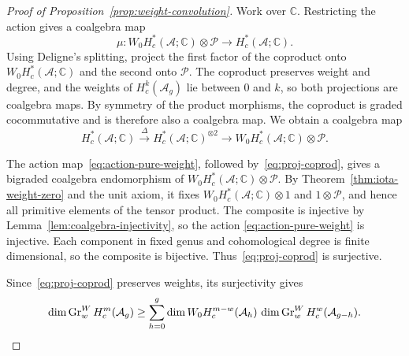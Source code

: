\documentclass[12 pt]{amsart}
\newcommand{\CC}{\mathbb{C}}
\newcommand{\cA}{\mathcal{A}}
\newcommand{\cP}{\mathcal{P}}
\newcommand{\Gr}{\operatorname{Gr}}
\newcommand{\<}{\langle}
\renewcommand{\>}{\rangle}
\theoremstyle{definition}
\begin{document}
\begin{proof}[Proof of Proposition~\ref{prop:weight-convolution}]
Work over $\CC$. Restricting the action gives a coalgebra map
\begin{equation}\label{eq:action-pure-weight}
\mu \colon W_0 H_c^*(\cA; \CC) \otimes \cP \longrightarrow H_c^*(\cA; \CC).
\end{equation}
Using Deligne's splitting, project the first factor of the coproduct onto $W_0 H_c^*(\cA; \CC)$ and the second onto $\cP$. The coproduct preserves weight and degree, and the weights of $H_c^k(\cA_g)$ lie between $0$ and $k$, so both projections are coalgebra maps. By symmetry of the product morphisms, the coproduct is graded cocommutative and is therefore also a coalgebra map. We obtain a coalgebra map
\begin{equation} \label{eq:proj-coprod}
H_c^*(\cA; \CC) \xrightarrow{\ \Delta \ } H_c^*(\cA; \CC)^{\otimes 2} \longrightarrow W_0 H_c^*(\cA; \CC) \otimes \cP.
\end{equation}

The action map~\eqref{eq:action-pure-weight}, followed by~\eqref{eq:proj-coprod}, gives a bigraded coalgebra endomorphism of $W_0 H_c^*(\cA; \CC) \otimes \cP$. By Theorem~\ref{thm:iota-weight-zero} and the unit axiom, it fixes $W_0 H_c^*(\cA; \CC) \otimes 1$ and $1 \otimes \cP$, and hence all primitive elements of the tensor product. The composite is injective by Lemma~\ref{lem:coalgebra-injectivity}, so the action \eqref{eq:action-pure-weight} is injective. Each component in fixed genus and cohomological degree is finite dimensional, so the composite is bijective. Thus~\eqref{eq:proj-coprod} is surjective.

Since~\eqref{eq:proj-coprod} preserves weights, its surjectivity gives
\[
\dim \Gr_w^W H_c^m(\cA_g) \geq \sum_{h = 0}^g \dim W_0 H_c^{m - w}(\cA_h) \, \dim \Gr_w^W H_c^w(\cA_{g - h}). \qedhere
\]
\end{proof}
\end{document}

